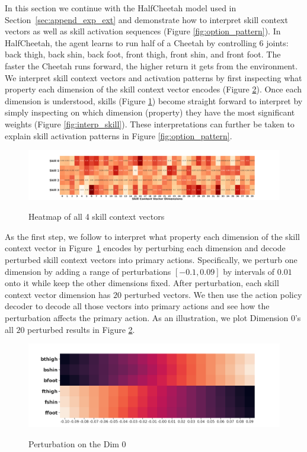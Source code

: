 In this section we continue with the HalfCheetah model used in
Section~\ref{sec:append_exp_ext} and demonstrate how to interpret
skill context vectors as well as skill activation sequences
(Figure \ref{fig:option_pattern}). In HalfCheetah, the agent
learns to run half of a Cheetah by controlling 6 joints: back
thigh, back shin, back foot, front thigh, front shin, and front
foot. The faster the Cheetah runs forward, the higher return it
gets from the environment. We interpret skill context vectors and
activation patterns by first inspecting what property each
dimension of the skill context vector encodes (Figure
\ref{fig:first_dim_perturb}). Once each dimension is understood,
skills (Figure \ref{fig:all_skill_vectors}) become straight
forward to interpret by simply inspecting on which dimension
(property) they have the most significant weights (Figure
\ref{fig:interp_skill}). These interpretations can further be
taken to explain skill activation patterns in Figure
\ref{fig:option_pattern}.
\begin{figure}[thb]
  \centering
  \includegraphics[width=1\linewidth]{./Part1/figures/all_skill_vectors.png}\\
  \caption{\label{fig:all_skill_vectors} Heatmap of all 4 skill
    context vectors}
\end{figure}

As the first step, we follow  to
interpret what property each dimension of the skill context
vector in Figure~\ref{fig:all_skill_vectors} encodes by
perturbing each dimension and decode perturbed skill context
vectors into primary actions. Specifically, we perturb one
dimension by adding a range of perturbations $[{-0.1}, 0.09]$ by
intervals of $0.01$ onto it while keep the other dimensions
fixed. After perturbation, each skill context vector dimension
has $20$ perturbed vectors. We then use the action policy decoder
to decode all those vectors into primary actions and see how the
perturbation affects the primary action. As an illustration, we
plot Dimension 0's all $20$ perturbed results in Figure
\ref{fig:first_dim_perturb}.
\begin{figure}[thb]
  \centering
  \includegraphics[width=1\linewidth]{./Part1/figures/skill_heatmap.png}\\
  \caption{\label{fig:first_dim_perturb} Perturbation on the
    Dim 0}
\end{figure}

